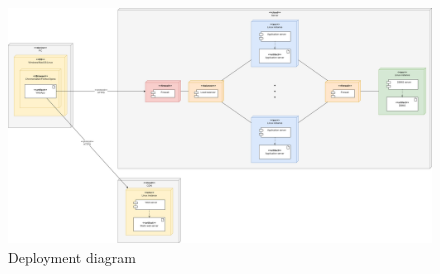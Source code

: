 \begin{figure}[ht]
    \centering
    \includegraphics[width=\textwidth]{images/diagrams/deployment_view.png}
    \caption{Deployment diagram}
    \label{fig:deployment_diagram}
\end{figure}

